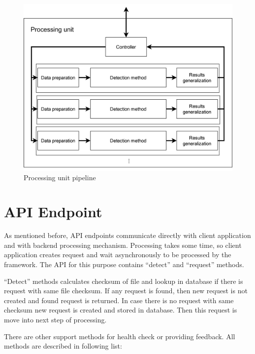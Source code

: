 \begin{figure}[H]
    \centering
    \includegraphics[width=.65\linewidth]{other-fig/framework_architecture_processing_unit.png}
    \caption{Processing unit pipeline}
\label{fig:framework_architecture_processing_unit}
\end{figure}

\section{API Endpoint}

As mentioned before, API endpoints communicate directly with client application and with backend processing mechanism. Processing takes some time, so client application creates request and wait asynchronously to be processed by the framework. The API for this purpose contains “detect” and “request” methods.

“Detect” methods calculates checksum of file and lookup in database if there is request with same file checksum. If any request is found, then new request is not created and found request is returned. In case there is no request with same checksum new request is created and stored in database. Then this request is move into next step of processing. 

There are other support methods for health check or providing feedback. All methods are described in following list:

